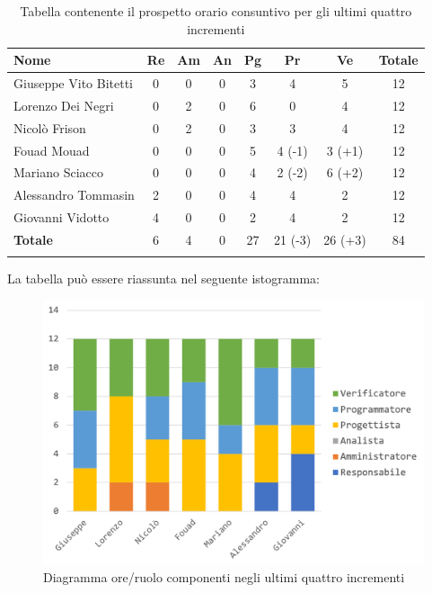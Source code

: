 			\begin{longtable}{|l|c|c|c|c|c|c|c|}
				\hline
				\rowcolor{lighter-grayer}
				\textbf{Nome} & \textbf{Re} & \textbf{Am} & \textbf{An} & \textbf{Pg}  & \textbf{Pr}   & \textbf{Ve} & \textbf{Totale} \\
				\hline
				\endfirsthead
				
				\hline
				Giuseppe Vito Bitetti 		 & 0 & 0 & 0 & 3 & 4 & 5  & 12\\
				\hline
				\hline
				Lorenzo Dei Negri			 & 0 & 2 & 0 & 6 & 0 & 4 & 12\\
				\hline
				\hline
				Nicolò Frison				    & 0 & 2  & 0 & 3  & 3 & 4 & 12\\
				\hline
				\hline
				Fouad Mouad 				 & 0 & 0 & 0 & 5 & 4 (-1) & 3 (+1) & 12\\
				\hline
				\hline
				Mariano Sciacco 			 & 0 & 0 & 0 & 4 & 2 (-2) & 6 (+2) & 12\\
				\hline
				\hline
				Alessandro Tommasin     & 2 & 0 & 0 & 4 & 4 & 2 & 12\\
				\hline
				\hline
				Giovanni Vidotto 			 & 4 & 0 & 0 & 2 & 4 & 2 & 12\\
				\hline 
				\textbf{Totale}			 		& 6 & 4 & 0 & 27 & 21 (-3) & 26 (+3) & 84\\
				\hline
				\caption{Tabella contenente il prospetto orario consuntivo per gli ultimi quattro incrementi}
			\end{longtable}
			
			La tabella può essere riassunta nel seguente istogramma:
			\begin{figure}[H]
				\centering
				\includegraphics[width=0.8\linewidth]{./images/consuntivo/ConsIncr9-12-1.png}
				\caption{Diagramma ore/ruolo componenti negli ultimi quattro incrementi}
				\label{fig:diagramma suddivione ruoli incrementi IX-XII}
			\end{figure}
			
